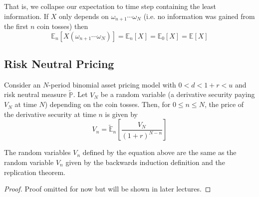 \documentclass[12pt]{article}
\newenvironment{theorem}[2][Theorem:]{\begin{trivlist} %
\item[\hskip \labelsep {\bfseries #1}\hskip \labelsep {\bfseries #2.}]}{\end{trivlist}}
\newlength\tindent
\renewcommand{\indent}{\hspace*{\tindent}}
\renewcommand{\P}{\mathbb P}
\newcommand{\E}{\mathbb E}
\begin{document}
\indent That is, we collapse our expectation to time step containing the least information. If $X$ only depends on $\omega_{n + 1}\cdots\omega_N$ (i.e. no information was gained from the first $n$ coin tosses) then
\begin{equation*}
	\E_n[X(\omega_{n + 1}\cdots\omega_N)] = \E_n[X] = \E_0[X] = \E[X]
\end{equation*}

\subsection{Risk Neutral Pricing}

\begin{theorem}{Risk Neutral Pricing Formula} Consider an $N$-period binomial asset pricing model with $0 < d < 1 + r < u$ and risk neutral measure $\tilde{\P}$. Let $V_N$ be a random variable (a derivative security paying $V_N$ at time $N$) depending on the coin tosses. Then, for $0 \leq n \leq N$, the price of the derivative security at time $n$ is given by
\begin{equation*}
	V_n = \tilde{\E}_n \left[ \frac{V_N}{(1 + r)^{N - n}} \right]
\end{equation*}

\indent The random variables $V_n$ defined by the equation above are the same as the random variable $V_n$ given by the backwards induction definition and the replication theorem.

\begin{proof} Proof omitted for now but will be shown in later lectures.

\end{proof}
\end{theorem}
\end{document}
